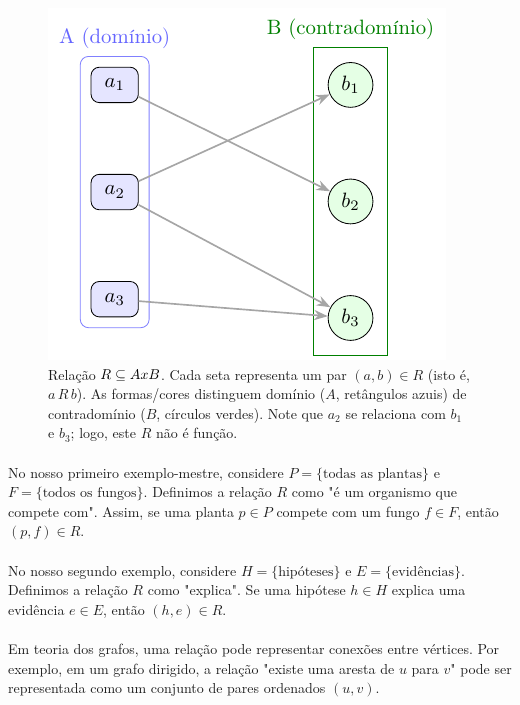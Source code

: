 \documentclass[12pt,a4paper]{article}
\def\emph#1{#1}%
\def\times{\string x}%
\begin{document}
\begin{figure}[H]
    \centering
    \includegraphics[width=0.9\linewidth]{figures/fig_relacao.pdf}

    \caption{Relação $R\subseteq A\times B$. Cada seta representa um par $(a,b)\in R$ (isto é, $a\,R\,b$). As formas/cores distinguem domínio ($A$, retângulos azuis) de contradomínio ($B$, círculos verdes). Note que $a_2$ se relaciona com $b_1$ e $b_3$; logo, este $R$ \emph{não é função}.}
    \label{fig:relacao}
    \end{figure}


\paragraph{}
No nosso primeiro exemplo-mestre, considere \(P=\{\text{todas as plantas}\}\) e \(F=\{\text{todos os fungos}\}\). Definimos a relação \(R\) como "é um organismo que compete com". Assim, se uma planta \(p \in P\) compete com um fungo \(f \in F\), então \((p,f) \in R\).

\paragraph{}
No nosso segundo exemplo, considere \(H=\{\text{hipóteses}\}\) e \(E=\{\text{evidências}\}\). Definimos a relação \(R\) como "explica". Se uma hipótese \(h \in H\) explica uma evidência \(e \in E\), então \((h,e) \in R\).

\paragraph{}
Em teoria dos grafos, uma relação pode representar conexões entre vértices. Por exemplo, em um grafo dirigido, a relação "existe uma aresta de \(u\) para \(v\)" pode ser representada como um conjunto de pares ordenados \((u,v)\).
\end{document}
